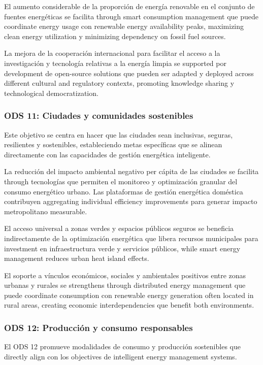 El aumento considerable de la proporción de energía renovable en el conjunto de fuentes energéticas se facilita through smart consumption management que puede coordinate energy usage con renewable energy availability peaks, maximizing clean energy utilization y minimizing dependency on fossil fuel sources.

La mejora de la cooperación internacional para facilitar el acceso a la investigación y tecnología relativas a la energía limpia se supported por development de open-source solutions que pueden ser adapted y deployed across different cultural and regulatory contexts, promoting knowledge sharing y technological democratization.

\subsubsection{ODS 11: Ciudades y comunidades sostenibles}

Este objetivo se centra en hacer que las ciudades sean inclusivas, seguras, resilientes y sostenibles, estableciendo metas específicas que se alinean directamente con las capacidades de gestión energética inteligente.

La reducción del impacto ambiental negativo per cápita de las ciudades se facilita through tecnologías que permiten el monitoreo y optimización granular del consumo energético urbano. Las plataformas de gestión energética doméstica contribuyen aggregating individual efficiency improvements para generar impacto metropolitano measurable.

El acceso universal a zonas verdes y espacios públicos seguros se beneficia indirectamente de la optimización energética que libera recursos municipales para investment en infraestructura verde y servicios públicos, while smart energy management reduces urban heat island effects.

El soporte a vínculos económicos, sociales y ambientales positivos entre zonas urbanas y rurales se strengthens through distributed energy management que puede coordinate consumption con renewable energy generation often located in rural areas, creating economic interdependencies que benefit both environments.

\subsubsection{ODS 12: Producción y consumo responsables}

El ODS 12 promueve modalidades de consumo y producción sostenibles que directly align con los objectives de intelligent energy management systems.


